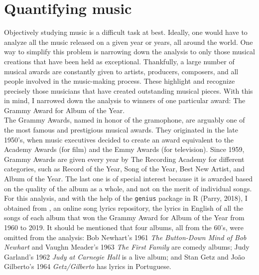 \documentclass{article}
\begin{document}
\section*{Quantifying music}


Objectively studying music is a difficult task at best. Ideally, one would have to analyze all the music released on a given year or years, all around the world. One way to simplify this problem is narrowing down the analysis to only those musical creations that have been held as exceptional. Thankfully, a large number of musical awards are constantly given to artists, producers, composers, and all people involved in the music-making process. These highlight and recognize precisely those musicians that have created outstanding musical pieces. With this in mind, I narrowed down the analysis to winners of one particular award: The Grammy Award for Album of the Year.  \\


The Grammy Awards, named in honor of the gramophone, are arguably one of the most famous and prestigious musical awards. They originated in the late 1950's, when music executives decided to create an award equivalent to the Academy Awards (for film) and the Emmy Awards (for television). Since 1959, Grammy Awards are given every year by The Recording Academy for different categories, such as Record of the Year, Song of the Year, Best New Artist, and Album of the Year. The last one is of special interest because it is awarded based on the quality of the album as a whole, and not on the merit of individual songs. \\



For this analysis, and with the help of the \texttt{genius} package in \textsf{R} (Parry, 2018), I obtained from \href{https://genius.com/}{}, an online song lyrics repository, the lyrics in English of all the songs of each album that won the Grammy Award for Album of the Year from 1960 to 2019. It should be mentioned that four albums, all from the 60's, were omitted from the analysis: Bob Newhart's 1961 \textit{The Button-Down Mind of Bob Newhart} and Vaughn Meader's 1963 \textit{The First Family} are comedy albums; Judy Garland's 1962 \textit{Judy at Carnegie Hall} is a live album; and Stan Getz and Jo\~{a}o Gilberto's 1964 \textit{Getz/Gilberto} has lyrics in Portuguese.  \\
\end{document}
